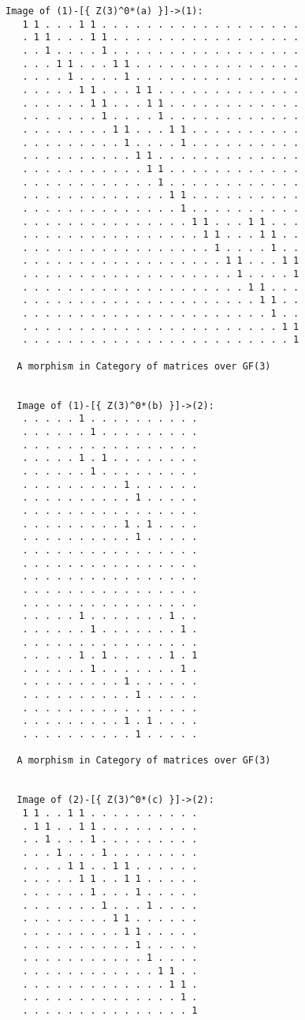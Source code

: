 \documentclass[a4paper,11pt]{report}
\begin{document}
{{{\begin{Verbatim}[commandchars=!@|,fontsize=\small,frame=single,label=Example]
  Image of (1)-[{ Z(3)^0*(a) }]->(1):
   1 1 . . . 1 1 . . . . . . . . . . . . . . . . . .
   . 1 1 . . . 1 1 . . . . . . . . . . . . . . . . .
   . . 1 . . . . 1 . . . . . . . . . . . . . . . . .
   . . . 1 1 . . . 1 1 . . . . . . . . . . . . . . .
   . . . . 1 . . . . 1 . . . . . . . . . . . . . . .
   . . . . . 1 1 . . . 1 1 . . . . . . . . . . . . .
   . . . . . . 1 1 . . . 1 1 . . . . . . . . . . . .
   . . . . . . . 1 . . . . 1 . . . . . . . . . . . .
   . . . . . . . . 1 1 . . . 1 1 . . . . . . . . . .
   . . . . . . . . . 1 . . . . 1 . . . . . . . . . .
   . . . . . . . . . . 1 1 . . . . . . . . . . . . .
   . . . . . . . . . . . 1 1 . . . . . . . . . . . .
   . . . . . . . . . . . . 1 . . . . . . . . . . . .
   . . . . . . . . . . . . . 1 1 . . . . . . . . . .
   . . . . . . . . . . . . . . 1 . . . . . . . . . .
   . . . . . . . . . . . . . . . 1 1 . . . 1 1 . . .
   . . . . . . . . . . . . . . . . 1 1 . . . 1 1 . .
   . . . . . . . . . . . . . . . . . 1 . . . . 1 . .
   . . . . . . . . . . . . . . . . . . 1 1 . . . 1 1
   . . . . . . . . . . . . . . . . . . . 1 . . . . 1
   . . . . . . . . . . . . . . . . . . . . 1 1 . . .
   . . . . . . . . . . . . . . . . . . . . . 1 1 . .
   . . . . . . . . . . . . . . . . . . . . . . 1 . .
   . . . . . . . . . . . . . . . . . . . . . . . 1 1
   . . . . . . . . . . . . . . . . . . . . . . . . 1
  
  A morphism in Category of matrices over GF(3)
  
  
  Image of (1)-[{ Z(3)^0*(b) }]->(2):
   . . . . . 1 . . . . . . . . . .
   . . . . . . 1 . . . . . . . . .
   . . . . . . . . . . . . . . . .
   . . . . . 1 . 1 . . . . . . . .
   . . . . . . 1 . . . . . . . . .
   . . . . . . . . . 1 . . . . . .
   . . . . . . . . . . 1 . . . . .
   . . . . . . . . . . . . . . . .
   . . . . . . . . . 1 . 1 . . . .
   . . . . . . . . . . 1 . . . . .
   . . . . . . . . . . . . . . . .
   . . . . . . . . . . . . . . . .
   . . . . . . . . . . . . . . . .
   . . . . . . . . . . . . . . . .
   . . . . . . . . . . . . . . . .
   . . . . . 1 . . . . . . . 1 . .
   . . . . . . 1 . . . . . . . 1 .
   . . . . . . . . . . . . . . . .
   . . . . . 1 . 1 . . . . . 1 . 1
   . . . . . . 1 . . . . . . . 1 .
   . . . . . . . . . 1 . . . . . .
   . . . . . . . . . . 1 . . . . .
   . . . . . . . . . . . . . . . .
   . . . . . . . . . 1 . 1 . . . .
   . . . . . . . . . . 1 . . . . .
  
  A morphism in Category of matrices over GF(3)
  
  
  Image of (2)-[{ Z(3)^0*(c) }]->(2):
   1 1 . . 1 1 . . . . . . . . . .
   . 1 1 . . 1 1 . . . . . . . . .
   . . 1 . . . 1 . . . . . . . . .
   . . . 1 . . . 1 . . . . . . . .
   . . . . 1 1 . . 1 1 . . . . . .
   . . . . . 1 1 . . 1 1 . . . . .
   . . . . . . 1 . . . 1 . . . . .
   . . . . . . . 1 . . . 1 . . . .
   . . . . . . . . 1 1 . . . . . .
   . . . . . . . . . 1 1 . . . . .
   . . . . . . . . . . 1 . . . . .
   . . . . . . . . . . . 1 . . . .
   . . . . . . . . . . . . 1 1 . .
   . . . . . . . . . . . . . 1 1 .
   . . . . . . . . . . . . . . 1 .
   . . . . . . . . . . . . . . . 1
  

\end{Verbatim}}}}
\end{document}
